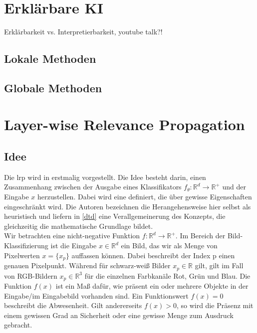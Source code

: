 \documentclass[twoside, 11pt,a4paper]{article}
\numberwithin{equation}{section}
\begin{document}
	\section{Erklärbare KI} \label{chapter_xai}
	
	Erklärbarkeit vs. Interpretierbarkeit, youtube talk?!
	
	\subsection{Lokale Methoden}
	
	\subsection{Globale Methoden}
	
	\section{Layer-wise Relevance Propagation} \label{chapter_lrp}
	\subsection{Idee}
	
	Die \gls{lrp} wird in \cite{LRP_first_paper} erstmalig vorgestellt. Die Idee besteht darin, einen Zusammenhang zwischen der Ausgabe eines Klassifikators $f_{\theta}: \mathbb{R}^d\to \mathbb{R^{+}}$ und der Eingabe $x$ herzustellen. Dabei wird eine definiert, die über gewisse Eigenschaften eingeschränkt wird. Die Autoren bezeichnen die Herangehensweise hier selbst als heuristisch und liefern in \ref{dtd} eine Verallgemeinerung des Konzepts, die gleichzeitig die mathematische Grundlage bildet.\\
	
	Wir betrachten eine nicht-negative Funktion $f: \mathbb{R}^d \to \mathbb{R}^{+}$. Im Bereich der Bild-Klassifizierung ist die Eingabe $x \in \mathbb{R}^d$ ein Bild, das wir als Menge von Pixelwerten $x=\lbrace x_p \rbrace$ auffassen können. Dabei beschreibt der Index p einen genauen Pixelpunkt. Während für schwarz-weiß Bilder $x_p \in \mathbb{R}$ gilt, gilt im Fall von RGB-Bildern $x_p \in \mathbb{R}^3$ für die einzelnen Farbkanäle Rot, Grün und Blau. Die Funktion $f(x)$ ist ein Maß dafür, wie präsent ein oder mehrere Objekte in der Eingabe/im Eingabebild vorhanden sind. Ein Funktionswert $f(x)=0$ beschreibt die Abwesenheit. Gilt andererseits $f(x) >0$, so wird die Präsenz mit einem gewissen Grad an Sicherheit oder eine gewisse Menge zum Ausdruck gebracht.\\
	
\end{document}
